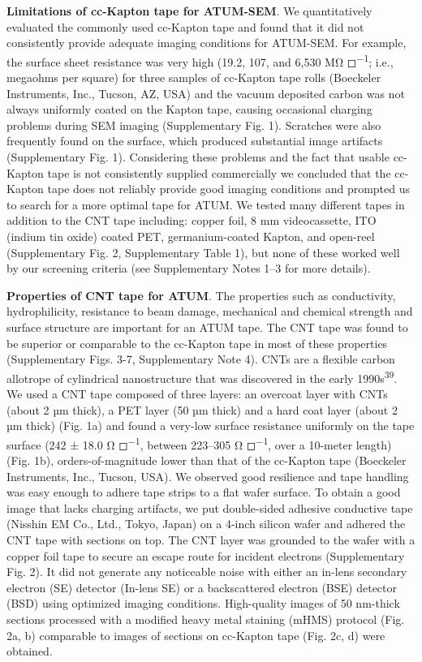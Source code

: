 \documentclass{article}
\begin{document}
\textbf{Limitations of cc-Kapton tape for ATUM-SEM}. We quantitatively evaluated the commonly used cc-Kapton tape and found that it did not consistently provide adequate imaging conditions for ATUM-SEM. For example, the surface sheet resistance was very high (19.2, 107, and 6,530 MΩ ◻\textsuperscript{−1}; i.e., megaohms per square) for three samples of cc-Kapton tape rolls (Boeckeler Instruments, Inc., Tucson, AZ, USA) and the vacuum deposited carbon was not always uniformly coated on the Kapton tape, causing occasional charging problems during SEM imaging (Supplementary Fig. 1). Scratches were also frequently found on the surface, which produced substantial image artifacts (Supplementary Fig. 1). Considering these problems and the fact that usable cc-Kapton tape is not consistently supplied commercially we concluded that the cc-Kapton tape does not reliably provide good imaging conditions and prompted us to search for a more optimal tape for ATUM. We tested many different tapes in addition to the CNT tape including: copper foil, 8 mm videocassette, ITO (indium tin oxide) coated PET, germanium-coated Kapton, and open-reel (Supplementary Fig. 2, Supplementary Table 1), but none of these worked well by our screening criteria (see Supplementary Notes 1–3 for more details).

\textbf{Properties of CNT tape for ATUM}. The properties such as conductivity, hydrophilicity, resistance to beam damage, mechanical and chemical strength and surface structure are important for an ATUM tape. The CNT tape was found to be superior or comparable to the cc-Kapton tape in most of these properties (Supplementary Figs. 3-7, Supplementary Note 4). CNTs are a flexible carbon allotrope of cylindrical nanostructure that was discovered in the early 1990s\textsuperscript{39}. We used a CNT tape composed of three layers: an overcoat layer with CNTs (about 2 µm thick), a PET layer (50 µm thick) and a hard coat layer (about 2 µm thick) (Fig. 1a) and found a very-low surface resistance uniformly on the tape surface (242 ± 18.0 Ω ◻\textsuperscript{−1}, between 223–305 Ω ◻\textsuperscript{−1}, over a 10-meter length) (Fig. 1b), orders-of-magnitude lower than that of the cc-Kapton tape (Boeckeler Instruments, Inc., Tucson, USA). We observed good resilience and tape handling was easy enough to adhere tape strips to a flat wafer surface. To obtain a good image that lacks charging artifacts, we put double-sided adhesive conductive tape (Nisshin EM Co., Ltd., Tokyo, Japan) on a 4-inch silicon wafer and adhered the CNT tape with sections on top. The CNT layer was grounded to the wafer with a copper foil tape to secure an escape route for incident electrons (Supplementary Fig. 2). It did not generate any noticeable noise with either an in-lens secondary electron (SE) detector (In-lens SE) or a backscattered electron (BSE) detector (BSD) using optimized imaging conditions. High-quality images of 50 nm-thick sections processed with a modified heavy metal staining (mHMS) protocol (Fig. 2a, b) comparable to images of sections on cc-Kapton tape (Fig. 2c, d) were obtained.
\end{document}
